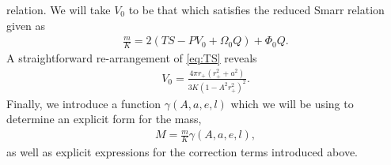 \documentclass[
twoside,openright,frontopenright]{dmathesis}
\begin{document}
relation. We will take $V_0$ to be that which satisfies the reduced Smarr
relation given as
\begin{align}\label{eq:Smarr0}
\frac{m}{K} = 2(TS-PV_0+\Omega_0 Q)+\Phi_0 Q.
\end{align}
A straightforward re-arrangement of \cref{eq:TS} reveals
\begin{align}\label{eq:V0}
V_0 = \frac{4\pi r_+ (r_+^2+a^2)}{3 K (1-A^2 r_+^2)^2}.
\end{align}
Finally, we introduce a function $\gamma(A,a,e,l)$ which we will be using to
determine an explicit form for the mass,
\begin{align}\label{eq:defM}
M=\frac{m}{K} \gamma(A,a,e,l),
\end{align}
as well as explicit expressions for the correction terms introduced above.
\end{document}
